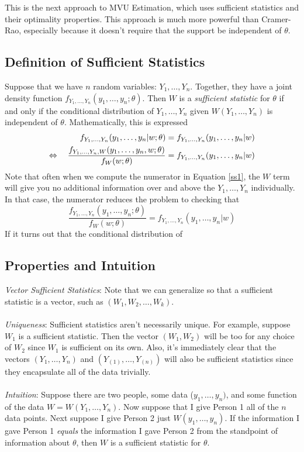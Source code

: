 \documentclass[a4paper,12pt]{scrartcl}
\begin{document}
This is the next approach to MVU Estimation, which uses sufficient
statistics and their optimality properties. This approach is
much more powerful than Cramer-Rao, especially because it doesn't
require that the support be independent of $\theta$.

\subsection{Definition of Sufficient Statistics}

Suppose that we have $n$ random variables: $Y_1, \ldots, Y_n$. Together,
they have a joint density function $f_{Y_1,\dots,Y_n}(y_1, \ldots, y_n ;
\theta).$
Then $W$ is a \emph{sufficient statistic} for $\theta$ if and only
if the conditional distribution of $Y_1, \ldots, Y_n$ given
$W(Y_1, \ldots, Y_n)$ is independent of $\theta$. Mathematically, this
is expressed
\begin{align}
   \label{ss1}
   f_{Y_1,\dots,Y_n}(y_1, \ldots, y_n | w; \theta) &=
   f_{Y_1,\dots,Y_n}(y_1, \ldots, y_n | w) \notag\\
   \Leftrightarrow \quad
   \frac{f_{Y_1,\dots,Y_n, W}(y_1, \ldots, y_n,  w; \theta)}{
	  f_{W}(w; \theta) } &=
      f_{Y_1,\dots,Y_n}(y_1, \ldots, y_n | w)
\end{align}
Note that often when we compute the numerator in Equation \ref{ss1},
the $W$ term will give you no additional information
over and above the $Y_1, \ldots, Y_n$ individually.  In that case,
the numerator reduces the problem to checking that
\begin{equation}
   \label{ss3}
   \frac{f_{Y_1,\dots,Y_n}(y_1, \ldots, y_n; \theta)}{f_W(w;\theta)}
      =f_{Y_1,\dots,Y_n}(y_1, \ldots, y_n | w)
\end{equation}
If it turns out that the conditional distribution of

\subsection{Properties and Intuition}

{\sl Vector Sufficient Statistics}:
Note that we can generalize so that a sufficient statistic is a vector,
such as $(W_1, W_2, \ldots, W_k)$.
\\
\\
{\sl Uniqueness}: Sufficient statistics aren't
necessarily unique. For example, suppose $W_1$ is a sufficient statistic.
Then the vector $(W_1, W_2)$ will be too for any choice of $W_2$
since $W_1$ is sufficient on its own. Also, it's immediately clear that
the vectors $(Y_1, \ldots, Y_n)$ and $(Y_{(1)}, \ldots, Y_{(n)})$ will
also be sufficient statistics since they encapsulate all of the data
trivially.
\\
\\
{\sl Intuition}:
Suppose there are two people, some data ($y_1, \ldots, y_n)$, and
some function of the data $W=W(Y_1, \ldots, Y_n)$. Now suppose that
I give Person 1 all of the $n$ data points. Next suppose I give
Person 2 just $W(y_1, \ldots, y_n)$. If the information I gave
Person 1 \emph{equals} the information I gave Person 2 from
the standpoint of information about $\theta$, then $W$ is a sufficient
statistic for $\theta$.
\end{document}
